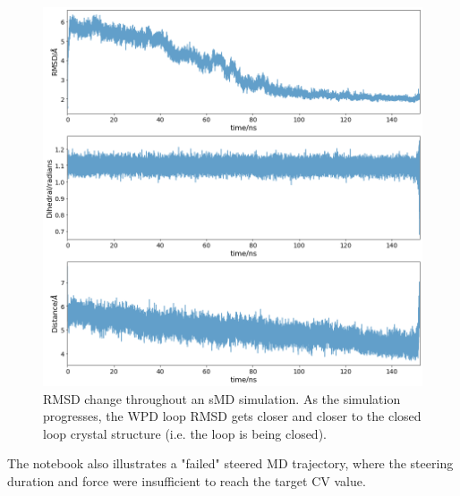 \begin{figure}[htp]
    \centering
    \includegraphics[width=\linewidth]{LIVECOMS/03_steered_md/COLVAR_all.png}
    \caption{RMSD change throughout an sMD simulation. As the simulation progresses, the WPD loop RMSD gets closer and closer to the closed loop crystal structure (i.e. the loop is being closed).}
    \label{fig:rmsd}
\end{figure}

The notebook also illustrates a "failed" steered MD trajectory, where the steering duration and force were insufficient to reach the target CV value.

